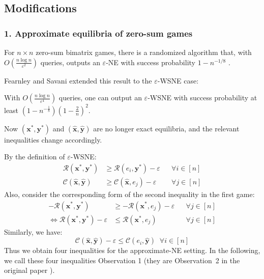 \subsection{Modifications}

\subsubsection*{1. Approximate equilibria of zero-sum games}

For $n \times n$ zero-sum bimatrix games, there is a randomized algorithm that, with $O\left(\frac{n \log n}{\varepsilon^2}\right)$ queries, outputs an $\varepsilon$-NE with success probability $1 - n^{-1/8}$ \cite[Theorem~1]{goldbergRoth14}.

Fearnley and Savani extended this result to the $\varepsilon$-WSNE case:
\begin{lemma}
  \label{lem:query-efficient-eps-wsne-in-zero_sum-games}
  With $O\left(\frac{n \log n}{\varepsilon^4}\right)$ queries, one can output an $\varepsilon$-WSNE with success probability at least $\left( 1 - n^{-\frac{1}{8}} \right)\left( 1 - \frac{2}{n} \right)^2$.
\end{lemma}

Now $(\mathbf{x}^*, \mathbf{y}^*)$ and $(\hat{\mathbf{x}}, \hat{\mathbf{y}})$ are no longer exact equilibria, and the relevant inequalities change accordingly.

By the definition of $\varepsilon$-WSNE:
\begin{align*}
  \mathcal{R}(\mathbf{x}^*, \mathbf{y}^*)         & \ge \mathcal{R}(e_i, \mathbf{y}^*) - \varepsilon     &  & \forall i \in [n] \\
  \mathcal{C}(\hat{\mathbf{x}}, \hat{\mathbf{y}}) & \ge \mathcal{C}(\hat{\mathbf{x}}, e_j) - \varepsilon &  & \forall j \in [n]
\end{align*}
Also, consider the corresponding form of the second inequality in the first game:
\begin{align*}
  -\mathcal{R}(\mathbf{x}^*, \mathbf{y}^*)                   & \ge -\mathcal{R}(\mathbf{x}^*, e_j) - \varepsilon &  & \forall j \in [n] \\
  \iff \mathcal{R}(\mathbf{x}^*, \mathbf{y}^*) - \varepsilon & \le \mathcal{R}(\mathbf{x}^*, e_j)                &  & \forall j \in [n]
\end{align*}
Similarly, we have:
\[
  \mathcal{C}(\hat{\mathbf{x}}, \hat{\mathbf{y}}) - \varepsilon \le \mathcal{C}(e_i, \hat{\mathbf{y}}) \;\; \forall i \in [n]
\]
Thus we obtain four inequalities for the approximate-NE setting. In the following, we call these four inequalities Observation 1 (they are Observation~2 in the original paper \cite[Observation~2]{12WSNE}).

